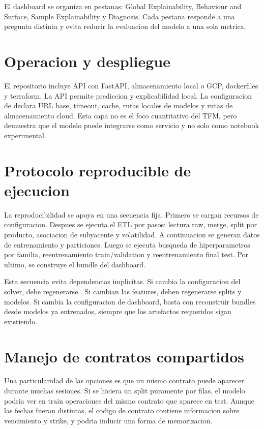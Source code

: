 El dashboard se organiza en pestanas: Global Explainability, Behaviour and Surface, Sample Explainability y Diagnosis. Cada pestana responde a una pregunta distinta y evita reducir la evaluacion del modelo a una sola metrica.

\section{Operacion y despliegue}

El repositorio incluye API con FastAPI, almacenamiento local o GCP, dockerfiles y terraform. La API permite prediccion y explicabilidad local. La configuracion de  declara URL base, timeout, cache, rutas locales de modelos y rutas de almacenamiento cloud. Esta capa no es el foco cuantitativo del TFM, pero demuestra que el modelo puede integrarse como servicio y no solo como notebook experimental.

\section{Protocolo reproducible de ejecucion}

La reproducibilidad se apoya en una secuencia fija. Primero se cargan recursos de configuracion. Despues se ejecuta el ETL por pasos: lectura raw, merge, split por producto, asociacion de subyacente y volatilidad. A continuacion se generan datos de entrenamiento y particiones. Luego se ejecuta busqueda de hiperparametros por familia, reentrenamiento train/validation y reentrenamiento final test. Por ultimo, se construye el bundle del dashboard.

Esta secuencia evita dependencias implicitas. Si cambia la configuracion del solver, debe regenerarse . Si cambian las features, deben regenerarse splits y modelos. Si cambia la configuracion de dashboard, basta con reconstruir bundles desde modelos ya entrenados, siempre que los artefactos requeridos sigan existiendo.

\section{Manejo de contratos compartidos}

Una particularidad de las opciones es que un mismo contrato puede aparecer durante muchas sesiones. Si se hiciera un split puramente por filas, el modelo podria ver en train operaciones del mismo contrato que aparece en test. Aunque las fechas fueran distintas, el codigo de contrato contiene informacion sobre vencimiento y strike, y podria inducir una forma de memorizacion.

